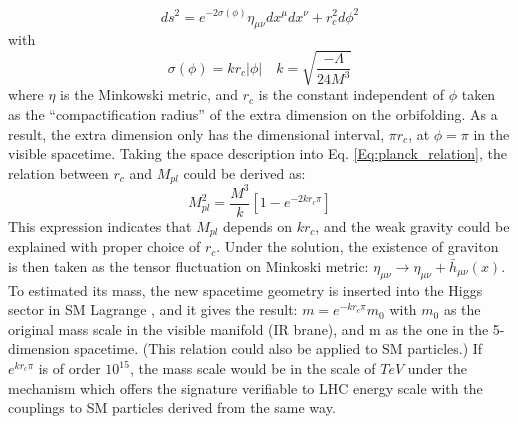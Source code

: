 \begin{equation}
ds^2=e^{-2\sigma(\phi)}\eta_{\mu\nu}dx^\mu dx^\nu + r_c^2 d\phi^2
\end{equation}
with
\begin{equation}
\sigma(\phi) = kr_c|\phi| \quad k=\sqrt{\frac{-\Lambda}{24M^3}}
\end{equation}
where $\eta$ is the Minkowski metric, and $r_{c}$ is the constant independent of $\phi$ taken as the ``compactification radius'' of the extra dimension on the orbifolding. As a result, the extra dimension only has the dimensional interval, $\pi r_{c}$, at $\phi=\pi$ in the visible spacetime. Taking the space description into Eq. \ref{Eq:planck_relation}, the relation between $r_c$ and $M_{pl}$ could be derived as:
\begin{equation}
M_{pl}^2=\frac{M^3}{k}\left[1-e^{-2kr_{c}\pi}\right]
\end{equation}
This expression indicates that $M_{pl}$ depends on $kr_{c}$, and the weak gravity could be explained with proper choice of $r_c$. Under the solution, the existence of graviton is then taken as the tensor fluctuation on Minkoski metric: $\eta_{\mu\nu} \rightarrow \eta_{\mu\nu}+\bar{h}_{\mu\nu}(x)$. To estimated its mass, the new spacetime geometry is inserted into the Higgs sector in SM Lagrange , and it gives the result: $m=e^{-kr_{c}\pi}m_{0}$ with $m_{0}$ as the original mass scale in the visible manifold (IR brane), and m as the one in the 5-dimension spacetime. (This relation could also be applied to SM particles.) If $e^{kr_{c}\pi}$ is of order $10^{15}$, the mass scale would be in the scale of $TeV$ under the mechanism which offers the signature verifiable to LHC energy scale with the couplings to SM particles derived from the same way.

